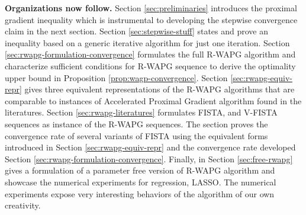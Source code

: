 \documentclass[12pt]{article}
\begin{document}
        \par
        \textbf{Organizations now follow.}
        Section \ref{sec:preliminaries} introduces the proximal gradient inequality which is instrumental to developing the stepwise convergence claim in the next section. 
        Section \ref{sec:stepwise-stuff} states and prove an inequality based on a generic iterative algorithm for just one iteration. 
        Section \ref{sec:rwapg-formulation-convergence} formulates the full R-WAPG algorithm and characterize sufficient conditions for R-WAPG sequence to derive the optimality upper bound in Proposition \ref{prop:wagp-convergence}. 
        Section \ref{sec:rwapg-equiv-repr} gives three equivalent representations of the R-WAPG algorithms that are comparable to instances of Accelerated Proximal Gradient algorithm found in the literatures. 
        Section \ref{sec:rwapg-literatures} formulates FISTA, and V-FISTA sequences as instance of the R-WAPG sequences.
        The section proves the convergence rate of several variants of FISTA using the equivalent forms introduced in Section \ref{sec:rwapg-equiv-repr} and the convergence rate developed Section \ref{sec:rwapg-formulation-convergence}. 
        Finally, in Section \ref{sec:free-rwapg} gives a formulation of a parameter free version of R-WAPG algorithm and showcase the numerical experiments for regression, LASSO. 
        The numerical experiments expose very interesting behaviors of the algorithm of our own creativity. 

        
       
\end{document}

